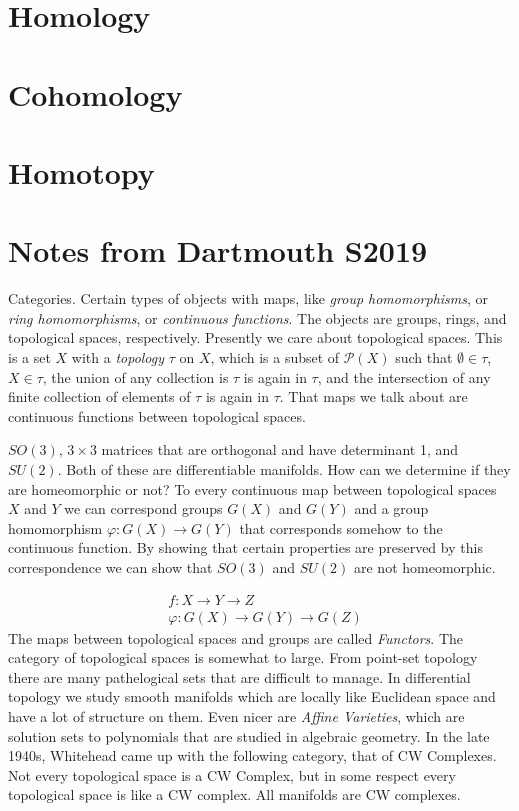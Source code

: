 \section{Homology}
\section{Cohomology}
\section{Homotopy}
\section{Notes from Dartmouth S2019}
    Categories. Certain types of objects with
    maps, like \textit{group homomorphisms}, or
    \textit{ring homomorphisms}, or
    \textit{continuous functions}. The objects
    are groups, rings, and topological spaces,
    respectively. Presently we care about
    topological spaces. This is a set $X$ with
    a \textit{topology} $\tau$ on $X$,
    which is a subset of $\mathcal{P}(X)$ such that
    $\emptyset\in\tau$, $X\in\tau$, the union of
    any collection is $\tau$ is again in $\tau$,
    and the intersection of any finite collection
    of elements of $\tau$ is again in $\tau$.
    That maps we talk about are continuous functions
    between topological spaces.
    \begin{example}
        $SO(3)$, $3\times{3}$ matrices that
        are orthogonal and have determinant 1, and
        $SU(2)$. Both of these are differentiable
        manifolds. How can we determine if they
        are homeomorphic or not? To every
        continuous map between topological spaces
        $X$ and $Y$ we can correspond groups
        $G(X)$ and $G(Y)$ and a group homomorphism
        $\varphi:G(X)\rightarrow{G}(Y)$ that
        corresponds somehow to the continuous
        function. By showing that certain properties
        are preserved by this correspondence we
        can show that $SO(3)$ and $SU(2)$ are not
        homeomorphic.
    \end{example}
    \begin{align}
        &f:X\rightarrow{Y}\rightarrow{Z}\\
        &\varphi:G(X)\rightarrow{G}(Y)
        \rightarrow{G}(Z)
    \end{align}
    The maps between topological spaces and groups
    are called \textit{Functors}. The category
    of topological spaces is somewhat to large.
    From point-set topology there are many
    pathelogical sets that are difficult to manage.
    In differential topology we study smooth
    manifolds which are locally like Euclidean space
    and have a lot of structure on them. Even
    nicer are \textit{Affine Varieties}, which
    are solution sets to polynomials that are
    studied in algebraic geometry. In the late
    1940s, Whitehead came up with the following
    category, that of CW Complexes. Not every
    topological space is a CW Complex, but in some
    respect every topological space is like a CW
    complex. All manifolds are CW complexes.
